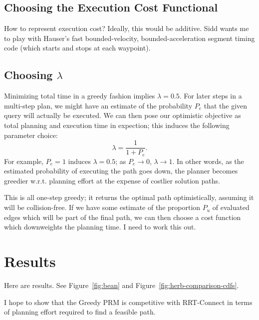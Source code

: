 \documentclass{report}
\begin{document}
\subsection{Choosing the Execution Cost Functional}

How to represent execution cost?
Ideally, this would be additive.
Sidd wants me to play with Hauser's fast bounded-velocity,
bounded-acceleration segment timing code
(which starts and stops at each waypoint).

\subsection{Choosing $\lambda$}

Minimizing total time in a greedy fashion implies $\lambda = 0.5$.
For later steps in a multi-step plan,
we might have an estimate of the probability $P_e$ that the given query will
actually be executed.
We can then pose our optimistic objective as total planning and execution
time in expection;
this induces the following parameter choice:
\begin{equation}
   \lambda = \frac{1}{1 + P_e} .
\end{equation}
For example, $P_e=1$ induces $\lambda = 0.5$;
as $P_e \rightarrow 0$, $\lambda \rightarrow 1$.
In other words,
as the estimated probability of executing the path goes down,
the planner becomes greedier w.r.t. planning effort at the expense of
costlier solution paths.

This is all one-step greedy;
it returns the optimal path optimistically,
assuming it will be collision-free.
If we have some estimate of the proportion $P_u$ of evaluated edges
which will be part of the final path,
we can then choose a cost function which downweights the planning time.
I need to work this out.

\section{Results}

Here are results.
See Figure~\ref{fig:bean} and Figure~\ref{fig:herb-comparison-cdfs}.

I hope to show that the Greedy PRM is competitive with RRT-Connect
in terms of planning effort required to find a feasible path.
\end{document}
